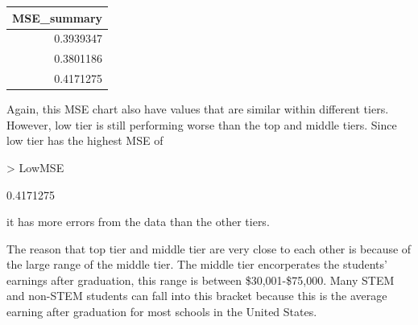 \documentclass{article}
\begin{document}
\begin{table}[ht]
\centering
\begin{tabular}{r}
  \hline
MSE\_summary \\ 
  \hline
0.3939347 \\ 
  0.3801186 \\ 
  0.4171275 \\ 
   \hline
\end{tabular}
\end{table}Again, this MSE chart also have values that are similar within different tiers. However, low tier is still performing worse than the top and middle tiers. Since low tier has the highest MSE of 
\begin{Schunk}
\begin{Sinput}
> LowMSE
\end{Sinput}
\begin{Soutput}
[1] 0.4171275
\end{Soutput}
\end{Schunk}
it has more errors from the data than the other tiers. 


The reason that top tier and middle tier are very close to each other is because of the large range of the middle tier. The middle tier encorperates the students' earnings after graduation, this range is between \$30,001-\$75,000. Many STEM and non-STEM students can fall into this bracket because this is the average earning after graduation for most schools in the United States.  
\newline
\end{document}
